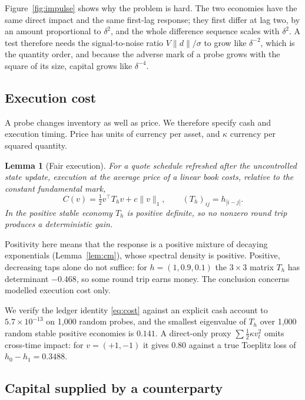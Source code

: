 \documentclass[12pt]{article}
\newtheorem{lemma}[theorem]{Lemma}
\theoremstyle{definition}
\theoremstyle{remark}
\begin{document}
Figure~\ref{fig:impulse} shows why the problem is hard. The two economies have the same direct impact and the same first-lag response; they first differ at lag two, by an amount proportional to $\delta^2$, and the whole difference sequence scales with $\delta^2$. A test therefore needs the signal-to-noise ratio $V\|d\|/\sigma$ to grow like $\delta^{-2}$, which is the quantity order, and because the adverse mark of a probe grows with the square of its size, capital grows like $\delta^{-4}$.

\subsection{Execution cost}

A probe changes inventory as well as price. We therefore specify cash and execution timing. Price has units of currency per asset, and $\kappa$ currency per squared quantity.

\begin{lemma}[Fair execution]\label{lem:toeplitz}
For a quote schedule refreshed after the uncontrolled state update, execution at the average price of a linear book costs, relative to the constant fundamental mark,
\begin{equation}\label{eq:cost}
C(v)=\tfrac12v^\top T_hv+c\|v\|_1,\qquad (T_h)_{ij}=h_{|i-j|}.
\end{equation}
In the positive stable economy $T_h$ is positive definite, so no nonzero round trip produces a deterministic gain.
\end{lemma}

Positivity here means that the response is a positive mixture of decaying exponentials (Lemma~\ref{lem:cm}), whose spectral density is positive. Positive, decreasing taps alone do not suffice: for $h=(1,0.9,0.1)$ the $3\times3$ matrix $T_h$ has determinant $-0.468$, so some round trip earns money. The conclusion concerns modelled execution cost only.

We verify the ledger identity \eqref{eq:cost} against an explicit cash account to $5.7\times10^{-13}$ on 1,000 random probes, and the smallest eigenvalue of $T_h$ over 1,000 random stable positive economies is $0.141$. A direct-only proxy $\sum\tfrac12\kappa v_t^2$ omits cross-time impact: for $v=(+1,-1)$ it gives $0.80$ against a true Toeplitz loss of $h_0-h_1=0.3488$.

\subsection{Capital supplied by a counterparty}
\end{document}
